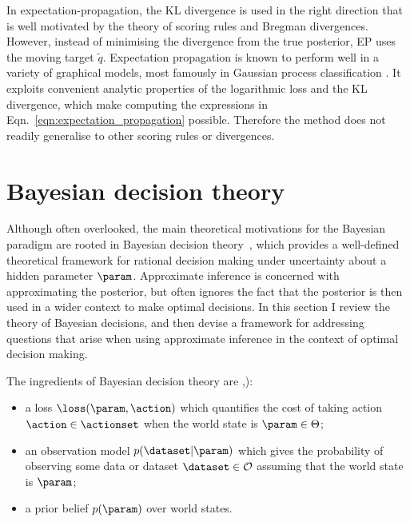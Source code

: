 In expectation-propagation, the KL divergence is used in the right direction that is well motivated by the theory of scoring rules and Bregman divergences. However, instead of minimising the divergence from the true posterior, EP uses the moving target $\tilde{q}$. Expectation propagation is known to perform well in a variety of graphical models, most famously in Gaussian process classification \citep{Nickisch2008}. It exploits convenient analytic properties of the logarithmic loss and the KL divergence, which make computing the expressions in Eqn.\ \eqref{eqn:expectation_propagation} possible. Therefore the method does not readily generalise to other scoring rules or divergences.

\section{Bayesian decision theory}

Although often overlooked, the main theoretical motivations for the Bayesian paradigm are rooted in Bayesian decision theory~\citep{berger85decision}, which provides a well-defined theoretical framework for rational decision making under uncertainty about a hidden parameter $\param$. Approximate inference is concerned with approximating the posterior, but often ignores the fact that the posterior is then used in a wider context to make optimal decisions. In this section I review the theory of Bayesian decisions, and then devise a framework for addressing questions that arise when using approximate inference in the context of optimal decision making.

The ingredients of Bayesian decision theory are \citep[][Chapter 2]{robert01choice},\citep[][Chapter 1]{berger85decision}):
\vspace{-.3cm}
\begin{itemize}
  \item a loss $\loss(\param,\action)$ which quantifies the cost of taking action $\action \in \actionset$ when the world state is $\param \in \Theta$; %
  \item an observation model $p(\dataset|\param)$ which gives the probability of observing some data or dataset $\dataset \in \mathcal{O}$ assuming that the world state is $\param$;
  \item a prior belief $p(\param)$ over world states.
\end{itemize}


